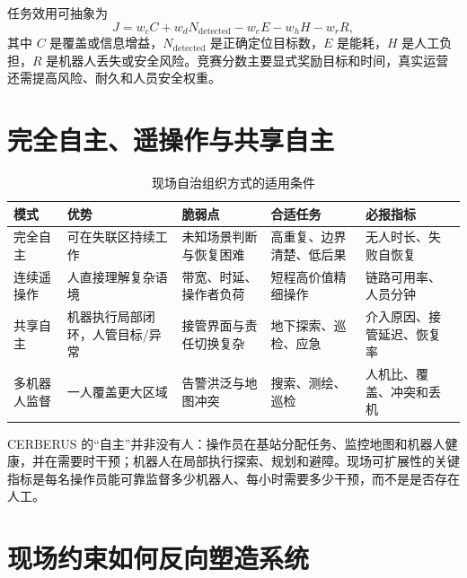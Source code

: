 任务效用可抽象为
\begin{equation}
J=w_c C+w_d N_{\mathrm{detected}}-w_e E-w_h H-w_r R,
\label{eq:field-mission-utility}
\end{equation}
其中 $C$ 是覆盖或信息增益，$N_{\mathrm{detected}}$ 是正确定位目标数，$E$ 是能耗，$H$ 是人工负担，$R$ 是机器人丢失或安全风险。竞赛分数主要显式奖励目标和时间，真实运营还需提高风险、耐久和人员安全权重。

\section{完全自主、遥操作与共享自主}

\begin{table}[H]
\begingroup{}
\centering
\caption{现场自治组织方式的适用条件}
\label{tab:field-autonomy-modes}
\begin{tabularx}{\textwidth}{p{}YYYp{0.20\textwidth}}
\toprule
模式 & 优势 & 脆弱点 & 合适任务 & 必报指标 \\
\midrule
完全自主 & 可在失联区持续工作 & 未知场景判断与恢复困难 & 高重复、边界清楚、低后果 & 无人时长、失败自恢复 \\
连续遥操作 & 人直接理解复杂语境 & 带宽、时延、操作者负荷 & 短程高价值精细操作 & 链路可用率、人员分钟 \\
共享自主 & 机器执行局部闭环，人管目标/异常 & 接管界面与责任切换复杂 & 地下探索、巡检、应急 & 介入原因、接管延迟、恢复率 \\
多机器人监督 & 一人覆盖更大区域 & 告警洪泛与地图冲突 & 搜索、测绘、巡检 & 人机比、覆盖、冲突和丢机 \\
\bottomrule
\end{tabularx}
\endgroup
\end{table}

CERBERUS 的“自主”并非没有人：操作员在基站分配任务、监控地图和机器人健康，并在需要时干预；机器人在局部执行探索、规划和避障。现场可扩展性的关键指标是每名操作员能可靠监督多少机器人、每小时需要多少干预，而不是是否存在人工。

\section{现场约束如何反向塑造系统}

